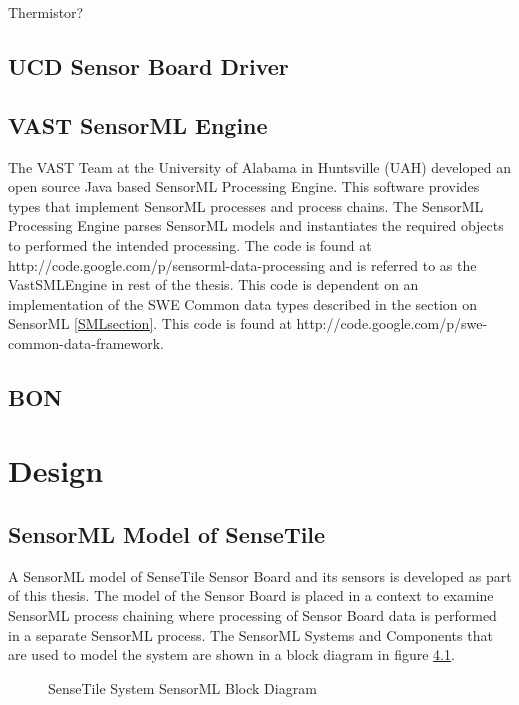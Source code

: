 \documentclass[]{final_report}
\begin{document}
Thermistor?

\section{UCD Sensor Board Driver}\label{SensorBoardDriverSec}


\section{VAST SensorML Engine}\label{VastSensorMLEngineSec}
The VAST Team at the University of Alabama in Huntsville (UAH)  developed an open source Java based SensorML Processing Engine. This software provides types that implement SensorML processes and process  chains. The SensorML Processing Engine parses SensorML models and instantiates the required objects to performed the intended processing. The code is found at http://code.google.com/p/sensorml-data-processing and is referred to as the VastSMLEngine in rest of the thesis. This code is dependent on an implementation of the SWE Common data types described in the section on SensorML \ref{SMLsection}. This code is found at http://code.google.com/p/swe-common-data-framework.


\section{BON}


\chapter{Design}
\section{SensorML Model of SenseTile}\label{SenseTileModelSec}

A SensorML model of SenseTile Sensor Board and its sensors is developed as part of this thesis. The model of the Sensor Board is placed in a context to examine SensorML process chaining where processing of Sensor Board data is performed in a separate SensorML process.  The SensorML Systems and Components that are used to model the system are shown in a  block diagram in figure \ref{fig:SensorML_SenseTile_System_comp}.


\begin{figure}[h]
\caption{SenseTile System SensorML Block Diagram}\label{fig:SensorML_SenseTile_System_comp}
\end{figure}
\end{document}
